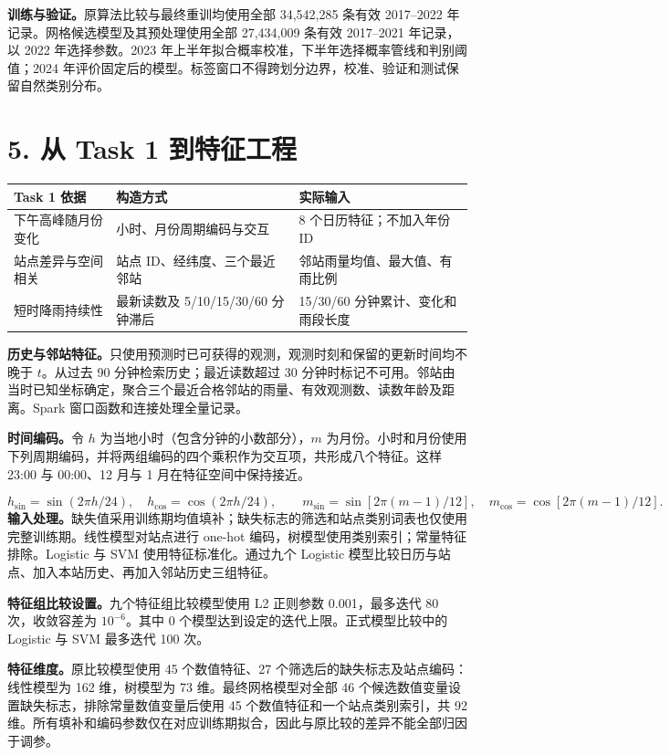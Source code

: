 \documentclass[UTF8,fontset=fandol,10pt,a4paper,landscape]{ctexart}
\begin{document}
\textbf{训练与验证。}原算法比较与最终重训均使用全部 34,542,285 条有效 2017--2022 年记录。网格候选模型及其预处理使用全部 27,434,009 条有效 2017--2021 年记录，以 2022 年选择参数。2023 年上半年拟合概率校准，下半年选择概率管线和判别阈值；2024 年评价固定后的模型。标签窗口不得跨划分边界，校准、验证和测试保留自然类别分布。

\clearpage\section*{5. 从 Task 1 到特征工程}
\begingroup\small
\begin{center}\begin{tabular}{p{5.2cm}p{9.0cm}p{9.0cm}}\toprule
Task 1 依据 & 构造方式 & 实际输入\\\midrule
下午高峰随月份变化 & 小时、月份周期编码与交互 & 8 个日历特征；不加入年份 ID\\
站点差异与空间相关 & 站点 ID、经纬度、三个最近邻站 & 邻站雨量均值、最大值、有雨比例\\
短时降雨持续性 & 最新读数及 5/10/15/30/60 分钟滞后 & 15/30/60 分钟累计、变化和雨段长度\\
\bottomrule\end{tabular}\end{center}

\textbf{历史与邻站特征。}只使用预测时已可获得的观测，观测时刻和保留的更新时间均不晚于 $t$。从过去 90 分钟检索历史；最近读数超过 30 分钟时标记不可用。邻站由当时已知坐标确定，聚合三个最近合格邻站的雨量、有效观测数、读数年龄及距离。Spark 窗口函数和连接处理全量记录。

\textbf{时间编码。}令 $h$ 为当地小时（包含分钟的小数部分），$m$ 为月份。小时和月份使用下列周期编码，并将两组编码的四个乘积作为交互项，共形成八个特征。这样 23:00 与 00:00、12 月与 1 月在特征空间中保持接近。

\[h_{\sin}=\sin(2\pi h/24),\quad h_{\cos}=\cos(2\pi h/24),\qquad m_{\sin}=\sin[2\pi(m-1)/12],\quad m_{\cos}=\cos[2\pi(m-1)/12].\]
\textbf{输入处理。}缺失值采用训练期均值填补；缺失标志的筛选和站点类别词表也仅使用完整训练期。线性模型对站点进行 one-hot 编码，树模型使用类别索引；常量特征排除。Logistic 与 SVM 使用特征标准化。通过九个 Logistic 模型比较日历与站点、加入本站历史、再加入邻站历史三组特征。

\textbf{特征组比较设置。}九个特征组比较模型使用 L2 正则参数 0.001，最多迭代 80 次，收敛容差为 $10^{-6}$。其中 0 个模型达到设定的迭代上限。正式模型比较中的 Logistic 与 SVM 最多迭代 100 次。

\textbf{特征维度。}原比较模型使用 45 个数值特征、27 个筛选后的缺失标志及站点编码：线性模型为 162 维，树模型为 73 维。最终网格模型对全部 46 个候选数值变量设置缺失标志，排除常量数值变量后使用 45 个数值特征和一个站点类别索引，共 92 维。所有填补和编码参数仅在对应训练期拟合，因此与原比较的差异不能全部归因于调参。
\end{document}
